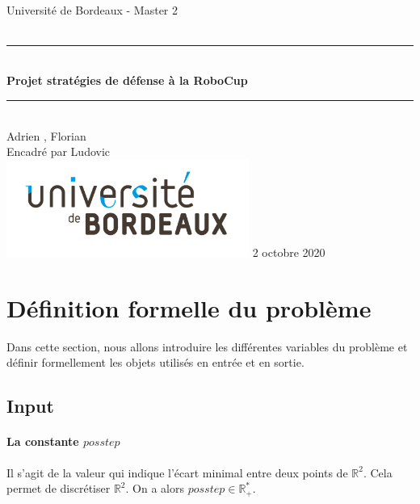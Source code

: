 \documentclass{article}
\begin{document}
\begin{titlepage}
    ~ \vfill
    \begin{center}
      \LARGE  Université de Bordeaux - Master 2\\[1.5cm]

      {\Large \bfseries {}}\\[0.5cm]

      \rule{\linewidth}{0.5mm}\\[0.4cm] {\Huge \bfseries Projet stratégies de défense à la RoboCup \\[0.2cm]} \rule{\linewidth}{0.5mm}\\[1.5cm] {
      \Large Adrien , Florian }\\[0.5cm]

                {\large Encadré par Ludovic }\\ \vfill
                \includegraphics[width = 300px]{logo.jpg} \vfill
                                {\large 2 octobre 2020}
    \end{center}
\end{titlepage}

\section{Définition formelle du problème}

Dans cette section, nous allons introduire les différentes variables du problème et définir formellement les objets utilisés en entrée et en sortie.

\subsection{Input}

\paragraph{La constante $posstep$} Il s'agit de la valeur qui indique l'écart minimal entre deux points de $\mathbb{R}^2$. Cela permet de discrétiser $\mathbb{R}^2$. On a alors $posstep \in \mathbb{R}^*_+$.
\end{document}
